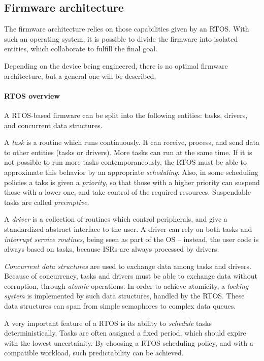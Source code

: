 \documentclass[a4paper,10pt]{article}
\begin{document}
\begin{multicols}{2}
\subsection{Firmware architecture}

The firmware architecture relies on those capabilities given by an RTOS. With
such an operating system, it is possible to divide the firmware into isolated
entities, which collaborate to fulfill the final goal.

Depending on the device being engineered, there is no optimal firmware
architecture, but a general one will be described.


\paragraph{RTOS overview}
A RTOS-based firmware can be split into the following entities: tasks,
drivers, and concurrent data structures.

A \emph{task} is a routine which runs continuously. It can receive, process,
and send data to other entities (tasks or drivers). More tasks can run at the
same time. If it is not possible to run more tasks contemporaneously, the RTOS
must be able to approximate this behavior by an appropriate \emph{scheduling}.
Also, in some scheduling policies a taks is given a \emph{priority}, so that
those with a higher priority can suspend those with a lower one, and take
control of the required resources. Suspendable tasks are called
\emph{preemptive}.

A \emph{driver} is a collection of routines which control peripherals, and
give a standardized abstract interface to the user. A driver can rely on both
tasks and \emph{interrupt service routines}, being seen as part of the OS
-- instead, the user code is always based on tasks, because ISRs are
always processed by drivers.

\emph{Concurrent data structures} are used to exchange data among tasks and
drivers. Because of concurrency, tasks and drivers must be able to exchange
data without corruption, through \emph{atomic} operations. In order to achieve
atomicity, a \emph{locking system} is implemented by such data structures,
handled by the RTOS. These data structures can span from simple semaphores
to complex data queues.

A very important feature of a RTOS is its ability to \emph{schedule} tasks
deterministically. Tasks are often assigned a fixed period, which should
expire with the lowest uncertainity. By choosing a RTOS scheduling policy,
and with a compatible workload, such predictability can be achieved.


\end{multicols}
\end{document}

